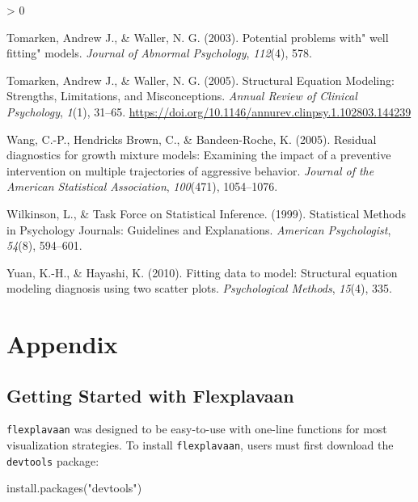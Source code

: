 \documentclass[
  english,
  man]{apa6}
\newenvironment{Shaded}{\begin{snugshade}}{\end{snugshade}}
\newcommand{\FunctionTok}[1]{\textcolor[rgb]{0.00,0.00,0.00}{#1}}
\newcommand{\NormalTok}[1]{#1}
\newcommand{\StringTok}[1]{\textcolor[rgb]{0.31,0.60,0.02}{#1}}
\newlength{\cslhangindent}
\newenvironment{CSLReferences}[2] %
 {%
  \setlength{\parindent}{0pt}
  \ifodd #1 \everypar{\setlength{\hangindent}{\cslhangindent}}\ignorespaces\fi
  \ifnum #2 > 0
  \setlength{\parskip}{#2\baselineskip}
  \fi
 }%
 {}
\begin{document}
\begin{CSLReferences}{1}{0}
\leavevmode\hypertarget{ref-tomarken2003potential}{}%
Tomarken, Andrew J., \& Waller, N. G. (2003). Potential problems with" well fitting" models. \emph{Journal of Abnormal Psychology}, \emph{112}(4), 578.

\leavevmode\hypertarget{ref-Tomarken2005}{}%
Tomarken, Andrew J., \& Waller, N. G. (2005). {Structural Equation Modeling: Strengths, Limitations, and Misconceptions}. \emph{Annual Review of Clinical Psychology}, \emph{1}(1), 31--65. \url{https://doi.org/10.1146/annurev.clinpsy.1.102803.144239}

\leavevmode\hypertarget{ref-wang2005residual}{}%
Wang, C.-P., Hendricks Brown, C., \& Bandeen-Roche, K. (2005). Residual diagnostics for growth mixture models: Examining the impact of a preventive intervention on multiple trajectories of aggressive behavior. \emph{Journal of the American Statistical Association}, \emph{100}(471), 1054--1076.

\leavevmode\hypertarget{ref-Wilkinson1999a}{}%
Wilkinson, L., \& Task Force on Statistical Inference. (1999). {Statistical Methods in Psychology Journals: Guidelines and Explanations}. \emph{American Psychologist}, \emph{54}(8), 594--601.

\leavevmode\hypertarget{ref-yuan2010fitting}{}%
Yuan, K.-H., \& Hayashi, K. (2010). Fitting data to model: Structural equation modeling diagnosis using two scatter plots. \emph{Psychological Methods}, \emph{15}(4), 335.

\end{CSLReferences}

\pagebreak

\hypertarget{appendix}{%
\section{Appendix}\label{appendix}}

\hypertarget{getting-started-with-flexplavaan}{%
\subsection{Getting Started with Flexplavaan}\label{getting-started-with-flexplavaan}}

\texttt{flexplavaan} was designed to be easy-to-use with one-line functions for most visualization strategies. To install \texttt{flexplavaan}, users must first download the \texttt{devtools} package:

\begin{Shaded}
\begin{Highlighting}[]
\FunctionTok{install.packages}\NormalTok{(}\StringTok{"devtools"}\NormalTok{)}
\end{Highlighting}
\end{Shaded}
\end{document}
